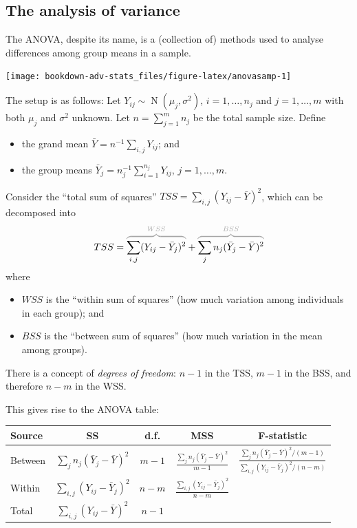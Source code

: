 \documentclass[
]{book}
\providecommand{\tightlist}{%
  \setlength{\itemsep}{0pt}\setlength{\parskip}{0pt}}
\DeclareMathOperator{\N}{N}
\newcommand{\myoverbrace}[3][gray!70]{{\color{#1}\overbrace{\color{black}#2}^{#3}}}
\theoremstyle{definition}
\theoremstyle{definition}
\theoremstyle{definition}
\theoremstyle{definition}
\theoremstyle{remark}
\begin{document}
\hypertarget{the-analysis-of-variance}{%
\subsection{The analysis of variance}\label{the-analysis-of-variance}}

The ANOVA, despite its name, is a (collection of) methods used to analyse differences among group means in a sample.

\begin{center}\texttt{[image: bookdown-adv-stats\_files/figure-latex/anovasamp-1]} \end{center}

The setup is as follows:
Let \(Y_{ij}\sim\N(\mu_j,\sigma^2)\), \(i=1,\dots,n_j\) and \(j=1,\dots,m\) with both \(\mu_j\) and \(\sigma^2\) unknown.
Let \(n=\sum_{j=1}^m n_j\) be the total sample size.
Define

\begin{itemize}
\tightlist
\item
  the grand mean \(\bar Y = n^{-1}\sum_{i,j} Y_{ij}\); and
\item
  the group means \(\bar Y_j = n_j^{-1} \sum_{i=1}^{n_j} Y_{ij}\), \(j=1,\dots,m\).
\end{itemize}

Consider the ``total sum of squares'' \(TSS = \sum_{i,j}(Y_{ij} - \bar Y)^2\), which can be decomposed into \[TSS = 
  \myoverbrace{\sum_{i,j} (Y_{ij} - \bar Y_j)^2}{WSS} +
  \myoverbrace{\sum_{j} n_j(\bar Y_j - \bar Y)^2}{BSS}\] where

\begin{itemize}
\tightlist
\item
  \(WSS\) is the ``within sum of squares'' (how much variation among individuals
  in each group); and
\item
  \(BSS\) is the ``between sum of squares'' (how much
  variation in the mean among groups).
\end{itemize}

There is a concept of \emph{degrees of freedom}: \(n-1\) in the TSS, \(m-1\) in
the BSS, and therefore \(n-m\) in the WSS.

This gives rise to the ANOVA table:

\begin{longtable}[]{@{}lcccc@{}}
\toprule
Source & SS & d.f. & MSS & F-statistic \\
\midrule
\endhead
Between & \(\sum_{j} n_j(\bar Y_j - \bar Y)^2\) & \(m-1\) & \(\frac{\sum_{j} n_j(\bar Y_j - \bar Y)^2}{m-1}\) & \(\frac{\sum_{j} n_j(\bar Y_j - \bar Y)^2/(m-1)}{\sum_{i,j} (Y_{ij} - \bar Y_j)^2/(n-m)}\) \\
Within & \(\sum_{i,j} (Y_{ij} - \bar Y_j)^2\) & \(n-m\) & \(\frac{\sum_{i,j} (Y_{ij} - \bar Y_j)^2}{n-m}\) & \\
Total & \(\sum_{i,j}(Y_{ij} - \bar Y)^2\) & \(n-1\) & & \\
\bottomrule
\end{longtable}
\end{document}
